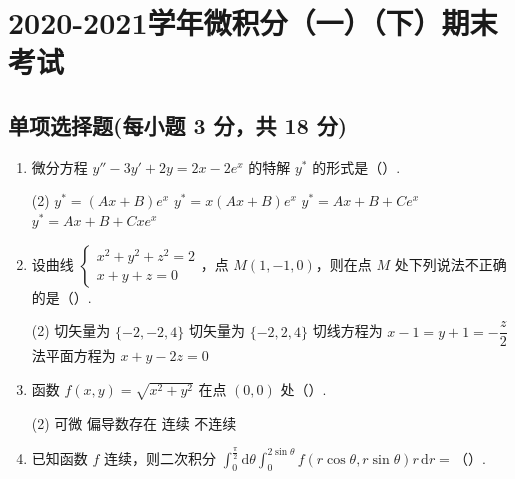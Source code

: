 \documentclass[../Main.tex]{subfiles}
\begin{document}
\chapter{2020-2021学年微积分（一）（下）期末考试}

\section{单项选择题(每小题 3 分，共 18 分)}
\begin{enumerate}
    \item 微分方程 \( y'' - 3y' + 2y = 2x - 2e^x \) 的特解 \( y^* \) 的形式是（\qquad）.

          \begin{tasks}[label=\textbf{\Alph*.}, label-width=1.5em, column-sep=1em](2)
              \task \( y^* = (Ax + B)e^x \)
              \task \( y^* = x(Ax + B)e^x \)
              \task \( y^* = Ax + B + Ce^x \)
              \task \( y^* = Ax + B + Cxe^x \)
          \end{tasks}

    \item 设曲线 \( \begin{cases} x^2 + y^2 + z^2 = 2 \\ x + y + z = 0 \end{cases} \)，点 \( M(1, -1, 0) \)，则在点 \( M \) 处下列说法\(\textbf{不正确}\)的是（\qquad）.

          \begin{tasks}[label=\textbf{\Alph*.}, label-width=1.5em, column-sep=1em](2)
              \task 切矢量为 \(\{-2, -2, 4\}\)
              \task 切矢量为 \(\{-2, 2, 4\}\)
              \task 切线方程为 \( x - 1 = y + 1 = -\dfrac{z}{2} \)
              \task 法平面方程为 \( x + y - 2z = 0 \)
          \end{tasks}

    \item 函数 \( f(x, y) = \sqrt{x^2 + y^2} \) 在点 \( (0, 0) \) 处（\qquad）.

          \begin{tasks}[label=\textbf{\Alph*.}, label-width=1.5em, column-sep=1em](2)
              \task 可微
              \task 偏导数存在
              \task 连续
              \task 不连续
          \end{tasks}

    \item 已知函数 \( f \) 连续，则二次积分 \( \displaystyle \int_0^{\frac{\pi}{2}} \mathrm{d}\theta \displaystyle \int_0^{2\sin\theta} f(r\cos\theta, r\sin\theta) r\,\mathrm{d}r = \)（\qquad）.


\end{enumerate}
\end{document}
